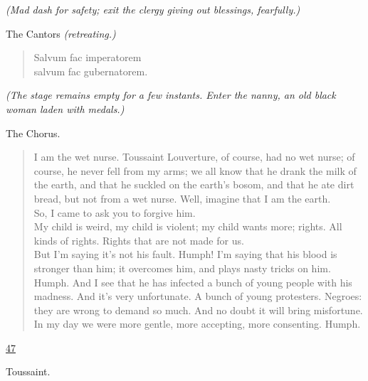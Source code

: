 \documentclass[letterpaper,article,12pt,oneside,notitlepage]{memoir}
\begin{document}
\textit{(Mad dash for safety; exit the clergy giving out blessings, fearfully.)}

\begin{center}The Cantors \textit{(retreating.)}\end{center}

\begin{verse}
Salvum fac imperatorem \\
salvum fac gubernatorem. \\
\end{verse}

\textit{(The stage remains empty for a few instants. Enter the nanny, an old black woman laden with medals.)}

\begin{center}The Chorus.\end{center}

\begin{verse}
I am the wet nurse. Toussaint Louverture, of course, had no wet nurse; of course, he never fell from my arms; we all know that he drank the milk of the earth, and that he suckled on the earth's bosom, and that he ate dirt bread, but not from a wet nurse. Well, imagine that I am the earth. \\
So, I came to ask you to forgive him. \\
My child is weird, my child is violent; my child wants more; rights. All kinds of rights. Rights that are not made for us. \\
But I'm saying it's not his fault. Humph! I'm saying that his blood is stronger than him; it overcomes him, and plays nasty tricks on him. Humph. And I see that he has infected a bunch of young people with his madness. And it's very unfortunate. A bunch of young protesters. Negroes: they are wrong to demand so much. And no doubt it will bring misfortune. In my day we were more gentle, more accepting, more consenting. Humph. \\
\end{verse}

\clearpage

\href{http://cesaire.elotroalex.com/chiens/chiens/p047.html}{47}

\begin{center}Toussaint.\end{center}
\end{document}
